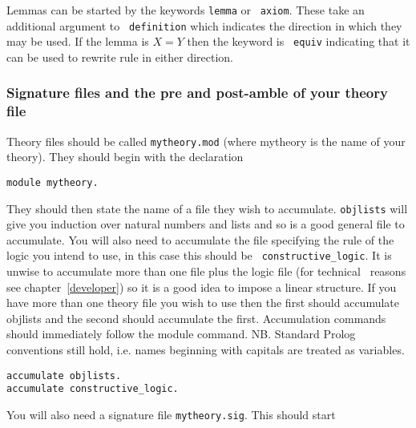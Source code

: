 Lemmas can be started by the keywords {\tt lemma} or {\tt
  axiom}.  These take an additional argument to {\tt
  definition} which indicates the direction in which
they may be used.  If the lemma is $X = Y$ then the keyword is {\tt
  equiv} indicating that it can be used to rewrite
rule in either direction.

\subsubsection*{Signature files and the pre and post-amble of your
theory file}

Theory files should be called {\tt mytheory.mod} (where mytheory is
the name of your theory).  They should begin with the declaration 

\begin{verbatim}
module mytheory.
\end{verbatim}

They should then state the name of a file they wish to accumulate.
{\tt objlists} will give you induction over natural numbers and lists
and so is a good general file to accumulate.  You will also need to
accumulate the file specifying the rule of the logic you intend to
use, in this case this should be {\tt
  constructive\_logic}.  It is unwise to  
accumulate more than one file plus the logic file (for technical \lprolog\ reasons see chapter~\ref{developer}) so it
is a good idea to impose a linear structure.  If you have more than
one theory file you wish to use then the first should
accumulate objlists and the second should
accumulate the first.  Accumulation commands should immediately follow 
the module command.  NB. Standard Prolog conventions still hold,
i.e. names beginning with capitals are treated as variables.

\begin{verbatim}
accumulate objlists.
accumulate constructive_logic.
\end{verbatim}
You will also need a signature file {\tt mytheory.sig}.  This should start

